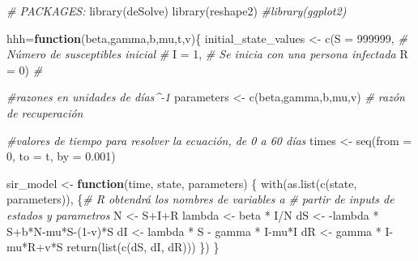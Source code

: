 \documentclass[
]{article}
\newenvironment{Shaded}{\begin{snugshade}}{\end{snugshade}}
\newcommand{\AttributeTok}[1]{\textcolor[rgb]{0.77,0.63,0.00}{#1}}
\newcommand{\CommentTok}[1]{\textcolor[rgb]{0.56,0.35,0.01}{\textit{#1}}}
\newcommand{\ControlFlowTok}[1]{\textcolor[rgb]{0.13,0.29,0.53}{\textbf{#1}}}
\newcommand{\DecValTok}[1]{\textcolor[rgb]{0.00,0.00,0.81}{#1}}
\newcommand{\FloatTok}[1]{\textcolor[rgb]{0.00,0.00,0.81}{#1}}
\newcommand{\FunctionTok}[1]{\textcolor[rgb]{0.00,0.00,0.00}{#1}}
\newcommand{\NormalTok}[1]{#1}
\newcommand{\OtherTok}[1]{\textcolor[rgb]{0.56,0.35,0.01}{#1}}
\newcommand{\SpecialCharTok}[1]{\textcolor[rgb]{0.00,0.00,0.00}{#1}}
\begin{document}
\begin{Shaded}
\begin{Highlighting}[]
\CommentTok{\# PACKAGES:}
\FunctionTok{library}\NormalTok{(deSolve)}
\FunctionTok{library}\NormalTok{(reshape2)}
\CommentTok{\#library(ggplot2)}

\NormalTok{hhh}\OtherTok{=}\ControlFlowTok{function}\NormalTok{(beta,gamma,b,mu,t,v)\{}
\NormalTok{initial\_state\_values }\OtherTok{\textless{}{-}} \FunctionTok{c}\NormalTok{(}\AttributeTok{S =} \DecValTok{999999}\NormalTok{,  }\CommentTok{\# Número de susceptibles inicial}
                                       \CommentTok{\# }
                          \AttributeTok{I =} \DecValTok{1}\NormalTok{,       }\CommentTok{\# Se inicia con una persona infectada}
                          \AttributeTok{R =} \DecValTok{0}\NormalTok{)       }\CommentTok{\# }


\CommentTok{\#razones en unidades de días\^{}{-}1}
\NormalTok{parameters }\OtherTok{\textless{}{-}} \FunctionTok{c}\NormalTok{(beta,gamma,b,mu,v)   }\CommentTok{\# razón de recuperación}

\CommentTok{\#valores de tiempo para resolver la ecuación, de 0 a 60 días}
\NormalTok{times }\OtherTok{\textless{}{-}} \FunctionTok{seq}\NormalTok{(}\AttributeTok{from =} \DecValTok{0}\NormalTok{, }\AttributeTok{to =}\NormalTok{ t, }\AttributeTok{by =} \FloatTok{0.001}\NormalTok{)   }

\NormalTok{sir\_model }\OtherTok{\textless{}{-}} \ControlFlowTok{function}\NormalTok{(time, state, parameters) \{  }
    \FunctionTok{with}\NormalTok{(}\FunctionTok{as.list}\NormalTok{(}\FunctionTok{c}\NormalTok{(state, parameters)), \{}\CommentTok{\# R obtendrá los nombres de variables a}
                                         \CommentTok{\# partir de inputs de estados y parametros}
\NormalTok{        N }\OtherTok{\textless{}{-}}\NormalTok{ S}\SpecialCharTok{+}\NormalTok{I}\SpecialCharTok{+}\NormalTok{R }
\NormalTok{        lambda }\OtherTok{\textless{}{-}}\NormalTok{ beta }\SpecialCharTok{*}\NormalTok{ I}\SpecialCharTok{/}\NormalTok{N}
\NormalTok{        dS }\OtherTok{\textless{}{-}} \SpecialCharTok{{-}}\NormalTok{lambda }\SpecialCharTok{*}\NormalTok{ S}\SpecialCharTok{+}\NormalTok{b}\SpecialCharTok{*}\NormalTok{N}\SpecialCharTok{{-}}\NormalTok{mu}\SpecialCharTok{*}\NormalTok{S}\SpecialCharTok{{-}}\NormalTok{(}\DecValTok{1}\SpecialCharTok{{-}}\NormalTok{v)}\SpecialCharTok{*}\NormalTok{S           }
\NormalTok{        dI }\OtherTok{\textless{}{-}}\NormalTok{ lambda }\SpecialCharTok{*}\NormalTok{ S }\SpecialCharTok{{-}}\NormalTok{ gamma }\SpecialCharTok{*}\NormalTok{ I}\SpecialCharTok{{-}}\NormalTok{mu}\SpecialCharTok{*}\NormalTok{I }
\NormalTok{        dR }\OtherTok{\textless{}{-}}\NormalTok{ gamma }\SpecialCharTok{*}\NormalTok{ I}\SpecialCharTok{{-}}\NormalTok{mu}\SpecialCharTok{*}\NormalTok{R}\SpecialCharTok{+}\NormalTok{v}\SpecialCharTok{*}\NormalTok{S         }
        \FunctionTok{return}\NormalTok{(}\FunctionTok{list}\NormalTok{(}\FunctionTok{c}\NormalTok{(dS, dI, dR))) }
\NormalTok{    \})}
\NormalTok{\}}


\end{Highlighting}
\end{Shaded}
\end{document}
